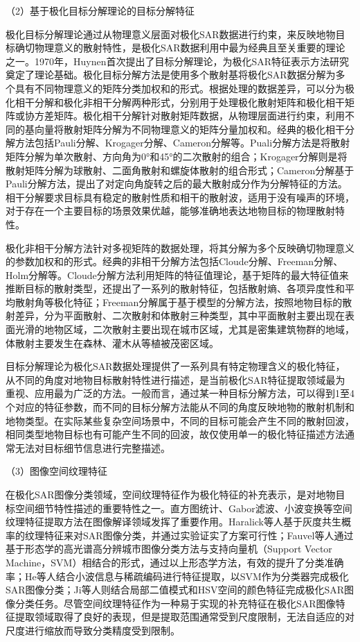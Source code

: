 （2）基于极化目标分解理论的目标分解特征

极化目标分解理论通过从物理意义层面对极化SAR数据进行约束，来反映地物目标确切物理意义的散射特性，是极化SAR数据利用中最为经典且至关重要的理论之一。1970年，Huynen首次提出了目标分解理论，为极化SAR特征表示方法研究奠定了理论基础。极化目标分解方法是使用多个散射基将极化SAR数据分解为多个具有不同物理意义的矩阵分类加权和的形式。根据处理的数据差异，可以分为极化相干分解和极化非相干分解两种形式，分别用于处理极化散射矩阵和极化相干矩阵或协方差矩阵。极化相干分解针对散射矩阵数据，从物理层面进行约束，利用不同的基向量将散射矩阵分解为不同物理意义的矩阵分量加权和。经典的极化相干分解方法包括Pauli分解、Krogager分解、Cameron分解等。Puali分解方法是将散射矩阵分解为单次散射、方向角为0°和45°的二次散射的组合；Krogager分解则是将散射矩阵分解为球散射、二面角散射和螺旋体散射的组合形式；Cameron分解基于Pauli分解方法，提出了对定向角旋转之后的最大散射成分作为分解特征的方法。相干分解要求目标具有稳定的散射性质和相干的散射波，适用于没有噪声的环境，对于存在一个主要目标的场景效果优越，能够准确地表达地物目标的物理散射特性。

极化非相干分解方法针对多视矩阵的数据处理，将其分解为多个反映确切物理意义的参数加权和的形式。经典的非相干分解方法包括Cloude分解、Freeman分解、Holm分解等。Cloude分解方法利用矩阵的特征值理论，基于矩阵的最大特征值来推断目标的散射类型，还提出了一系列的散射特征，包括散射熵、各项异度性和平均散射角等极化特征；Freeman分解属于基于模型的分解方法，按照地物目标的散射差异，分为平面散射、二次散射和体散射三种类型，其中平面散射主要出现在表面光滑的地物区域，二次散射主要出现在城市区域，尤其是密集建筑物群的地域，体散射主要发生在森林、灌木从等植被茂密区域。

目标分解理论为极化SAR数据处理提供了一系列具有特定物理含义的极化特征，从不同的角度对地物目标散射特性进行描述，是当前极化SAR特征提取领域最为重视、应用最为广泛的方法。一般而言，通过某一种目标分解方法，可以得到1至4个对应的特征参数，而不同的目标分解方法能从不同的角度反映地物的散射机制和地物类型。在实际某些复杂空间场景中，不同的目标可能会产生不同的散射回波，相同类型地物目标也有可能产生不同的回波，故仅使用单一的极化特征描述方法通常无法对目标细节信息进行完整描述。

（3）图像空间纹理特征

在极化SAR图像分类领域，空间纹理特征作为极化特征的补充表示，是对地物目标空间细节特性描述的重要特性之一。直方图统计、Gabor滤波、小波变换等空间纹理特征提取方法在图像解译领域发挥了重要作用。Haralick等人基于灰度共生概率的纹理特征来对SAR图像分类，并通过实验证实了方案可行性；Fauvel等人通过基于形态学的高光谱高分辨城市图像分类方法与支持向量机（Support Vector Machine，SVM）相结合的形式，通过以上形态学方法，有效的提升了分类准确率；He等人结合小波信息与稀疏编码进行特征提取，以SVM作为分类器完成极化SAR图像分类；Ji等人则结合局部二值模式和HSV空间的颜色特征完成极化SAR图像分类任务。尽管空间纹理特征作为一种易于实现的补充特征在极化SAR图像特征提取领域取得了良好的表现，但是提取范围通常受到尺度限制，无法自适应的对尺度进行缩放而导致分类精度受到限制。

